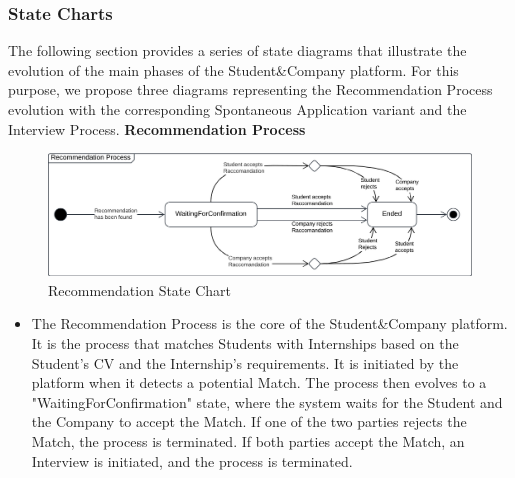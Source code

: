 \subsubsection{State Charts}
The following section provides a series of state diagrams that illustrate the evolution of the main phases of the Student\&Company platform. For this purpose, we propose three diagrams representing the Recommendation Process evolution with the corresponding Spontaneous Application variant and the Interview Process.
\newline\newline
\noindent\textbf{Recommendation Process}\\
\begin{figure}[ht]
    \centering
    \includegraphics[width=1 \textwidth]{Diagrams/StateCharts/RecommendationStateChart.png}
    \caption{Recommendation State Chart}
    \label{fig:RecommendationProcess}
\end{figure}
\begin{itemize}
    \item The Recommendation Process is the core of the Student\&Company platform. It is the process that matches Students with Internships based on the Student's CV and the Internship's requirements. It is initiated by the platform when it detects a potential Match. The process then evolves to a "WaitingForConfirmation" state, where the system waits for the Student and the Company to accept the Match. If one of the two parties rejects the Match, the process is terminated. If both parties accept the Match, an Interview is initiated, and the process is terminated.
\end{itemize}

